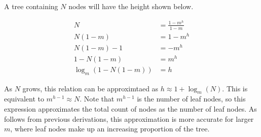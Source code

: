 \begin{figure}[H]
\end{figure}

A tree containing $N$ nodes will have the height shown below.

\begin{align*}
	N &= \frac{1-m^h}{1-m} \\
	N (1-m) &= 1-m^h \\
	N (1-m) - 1 &= -m^h \\
	1 - N (1-m) &= m^h \\
	\log_m\left(1 - N (1-m)\right) &= h
\end{align*}

As $N$ grows, this relation can be approximtaed as $h \approx 1 + \log_m(N)$.
This is equivalent to  $m^{h-1} \approx N$. Note that $m^{h-1}$ is the number of
leaf nodes, so this expression approximates the total count of nodes as the
number of leaf nodes. As follows from previous derivations, this approximation
is more accurate for larger $m$, where leaf nodes make up an increasing
proportion of the tree.

\begin{figure}[H]
\end{figure}

